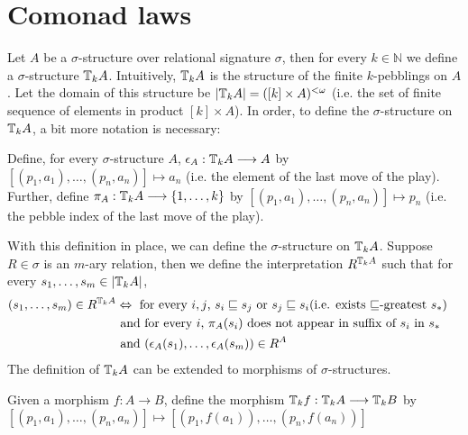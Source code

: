 \section{Comonad laws}
Let $A$ be a $\sigma$-structure over relational signature $\sigma$, then for every $k \in \mathbb{N}$ we define a $\sigma$-structure ${\mathbb{T}_{k}A}$. Intuitively, ${\mathbb{T}_{k}A}$ is the structure of the finite $k$-pebblings on $A$. Let the domain of this structure be $|{\mathbb{T}_{k}A}| = ([k] \times A)^{<\omega}$ (i.e. the set of finite sequence of elements in product $[k] \times A$). In order, to define the $\sigma$-structure on ${\mathbb{T}_{k}A}$, a bit more notation is necessary:
\begin{defn}
Define, for every $\sigma$-structure $A$, $\epsilon_{A}:{\mathbb{T}_{k}A} \longrightarrow A$ by $[(p_{1},a_{1}),\dots,(p_{n},a_{n})] \mapsto a_{n}$ (i.e. the element of the last move of the play). Further, define $\pi_{A}:{\mathbb{T}_{k}A} \longrightarrow \{1,\dots,k\}$ by $[(p_{1},a_{1}),\dots,(p_{n},a_{n})] \mapsto p_{n}$ (i.e. the pebble index of the last move of the play).
\label{defn:epsilonP}
\end{defn}
With this definition in place, we can define the $\sigma$-structure on ${\mathbb{T}_{k}A}$. Suppose $R \in \sigma$ is an $m$-ary relation, then we define the interpretation $R^{{\mathbb{T}_{k}A}}$ such that for every $s_{1},\dots,s_{m} \in |{\mathbb{T}_{k}A}|$, 
\begin{align}
(s_{1},\dots,s_{m}) \in R^{{\mathbb{T}_{k}A}}  &\Leftrightarrow    \text{ for every $i,j$, } s_{i} \sqsubseteq s_{j} \text{ or } s_{j} \sqsubseteq s_{i} \text{(i.e. exists $\sqsubseteq$-greatest $s_{*}$)} & \label{eq:R1st}\\
&\text{ and for every $i$, } \pi_{A}(s_{i}) \text{ does not appear in suffix of $s_{i}$ in $s_{*}$ } & \label{eq:R2nd} \\
&\text{ and } (\epsilon_{A}(s_{1}),\dots,\epsilon_{A}(s_{m})) \in R^{A} & \label{eq:R3rd}
\end{align}
The definition of ${\mathbb{T}_{k}A}$ can be extended to morphisms of $\sigma$-structures. 
\begin{defn}
Given a morphism $f:A \longrightarrow B$, define the morphism ${\mathbb{T}_{k}f}:{\mathbb{T}_{k}A} \longrightarrow {\mathbb{T}_{k}B}$ by $[(p_{1},a_{1}),\dots,(p_{n},a_{n})] \mapsto [(p_{1},f(a_{1})),\dots,(p_{n},f(a_{n}))]$
\label{defn:comonadMorphismP}
\end{defn}
